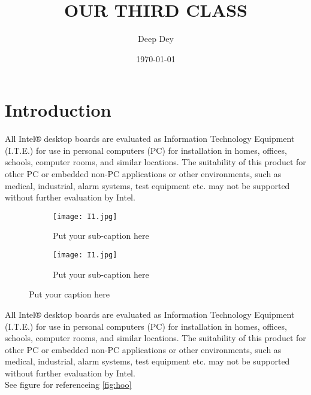 \documentclass[12pt]{article}
\title{OUR THIRD CLASS}
\author{Deep Dey}
\date{\today}
\begin{document}
    
    \maketitle
    \hrulefill
    \tableofcontents
    \pagebreak
    
    \section{Introduction}
     All Intel® desktop boards are evaluated as Information Technology Equipment (I.T.E.) for use in personal computers (PC) for installation in homes, offices, schools, computer rooms, and similar locations. The suitability of this product for other PC or embedded non-PC applications or other environments, such as medical, industrial, alarm systems, test equipment etc. may not be supported without further evaluation by Intel.\\
     
     \begin{center}
     
     \begin{figure}[ht]
\begin{subfigure}{.5\linewidth}
  \centering
  \texttt{[image: I1.jpg]}  
  \caption{Put your sub-caption here}
  \label{fig:sub-first}
\end{subfigure}
\begin{subfigure}{.5\linewidth}
  \centering
  \texttt{[image: I1.jpg]}  
  \caption{Put your sub-caption here}
  \label{fig:sub-second}
\end{subfigure}
\caption{Put your caption here}
\label{fig:fig}
\end{figure}
     
     \end{center}
     
     All Intel® desktop boards are evaluated as Information Technology Equipment (I.T.E.) for use in personal computers (PC) for installation in homes, offices, schools, computer rooms, and similar locations. The suitability of this product for other PC or embedded non-PC applications or other environments, such as medical, industrial, alarm systems, test equipment etc. may not be supported without further evaluation by Intel.\\
     
     See figure for referenceing \ref{fig:hoo}
\end{document}
